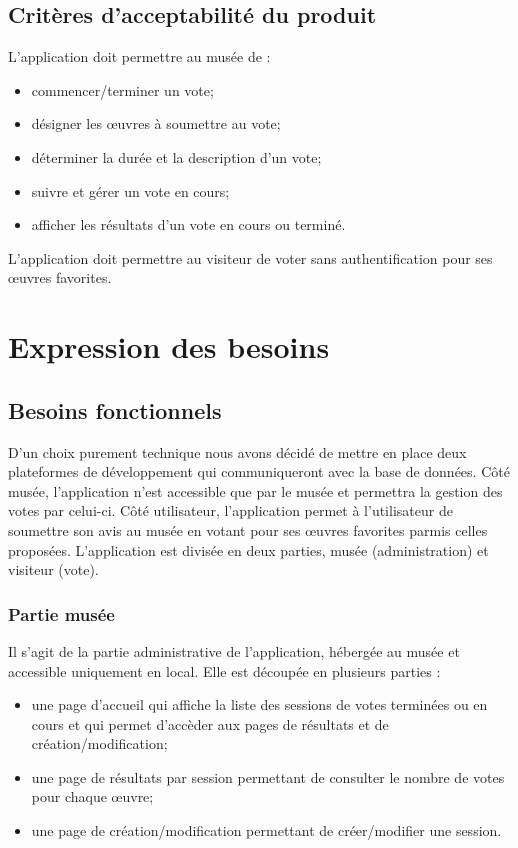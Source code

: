 \documentclass[a4paper]{article}
\begin{document}
\subsection{Critères d'acceptabilité du produit}
L’application doit permettre au musée de :
\begin{itemize}
\item commencer/terminer un vote;
\item désigner les œuvres à soumettre au vote;
\item déterminer la durée et la description d'un vote;
\item suivre et gérer un vote en cours;
\item afficher les résultats d'un vote en cours ou terminé.
\end{itemize}
L’application doit permettre au visiteur de voter sans authentification pour ses œuvres favorites.

\section{Expression des besoins}
\subsection{Besoins fonctionnels}
D'un choix purement technique nous avons décidé de mettre en place deux plateformes de développement qui communiqueront avec la base de données. Côté musée, l'application n'est accessible que par le musée et permettra la gestion des votes par celui-ci. Côté utilisateur, l’application permet à l'utilisateur de soumettre son avis au musée en votant pour ses œuvres favorites parmis celles proposées. L’application est divisée en deux parties, musée (administration) et visiteur (vote).

\subsubsection{Partie musée}
Il s’agit de la partie administrative de l’application, hébergée au musée et accessible uniquement en local. Elle est découpée en plusieurs parties :
\begin{itemize}
\item une page d'accueil qui affiche la liste des sessions de votes terminées ou en cours et qui permet d'accèder aux pages de résultats et de création/modification;
\item une page de résultats par session permettant de consulter le nombre de votes pour chaque œuvre;
\item une page de création/modification permettant de créer/modifier une session.\\
\end{itemize}
\end{document}
